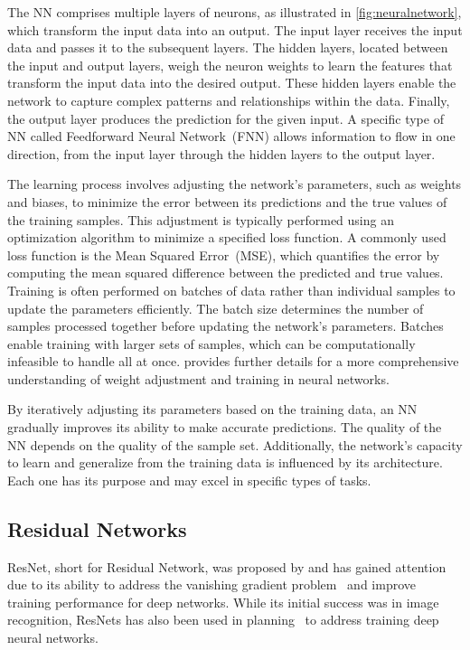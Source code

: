 The NN comprises multiple layers of neurons, as illustrated in \cref{fig:neuralnetwork}, which transform the input data into an output. The input layer receives the input data and passes it to the subsequent layers. The hidden layers, located between the input and output layers, weigh the neuron weights to learn the features that transform the input data into the desired output. These hidden layers enable the network to capture complex patterns and relationships within the data. Finally, the output layer produces the prediction for the given input. A specific type of NN called Feedforward Neural Network~(FNN) allows information to flow in one direction, from the input layer through the hidden layers to the output layer.

The learning process involves adjusting the network's parameters, such as weights and biases, to minimize the error between its predictions and the true values of the training samples. This adjustment is typically performed using an optimization algorithm to minimize a specified loss function. A commonly used loss function is the Mean Squared Error~(MSE), which quantifies the error by computing the mean squared difference between the predicted and true values. Training is often performed on batches of data rather than individual samples to update the parameters efficiently. The batch size determines the number of samples processed together before updating the network's parameters. Batches enable training with larger sets of samples, which can be computationally infeasible to handle all at once. \citet{haykin2009neural} provides further details for a more comprehensive understanding of weight adjustment and training in neural networks.

By iteratively adjusting its parameters based on the training data, an NN gradually improves its ability to make accurate predictions. The quality of the NN depends on the quality of the sample set. Additionally, the network's capacity to learn and generalize from the training data is influenced by its architecture. Each one has its purpose and may excel in specific types of tasks.

\subsection{Residual Networks}
\label{sec:resnets}

ResNet, short for Residual Network, was proposed by \citet{he2016deep} and has gained attention due to its ability to address the vanishing gradient problem~\cite{hochreiter1998vanishing} and improve training performance for deep networks. While its initial success was in image recognition, ResNets has also been used in planning~\cite{agostinelli2019solving,ferber2022neural} to address training deep neural networks.

